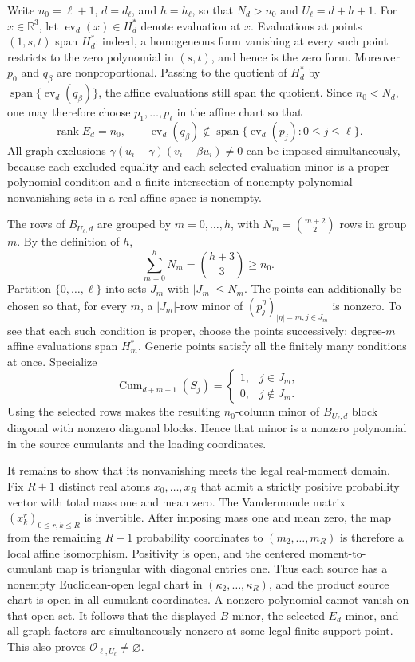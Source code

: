 Write \(n_0=\ell+1\), \(d=d_\ell\), and \(h=h_\ell\), so that \(N_d>n_0\) and \(U_\ell=d+h+1\).  For \(x\in\mathbb R^3\), let \(\operatorname{ev}_d(x)\in H_d^*\) denote evaluation at \(x\).  Evaluations at points \((1,s,t)\) span \(H_d^*\): indeed, a homogeneous form vanishing at every such point restricts to the zero polynomial in \((s,t)\), and hence is the zero form.  Moreover \(p_0\) and \(q_\beta\) are nonproportional.  Passing to the quotient of \(H_d^*\) by \(\operatorname{span}\{\operatorname{ev}_d(q_\beta)\}\), the affine evaluations still span the quotient.  Since \(n_0<N_d\), one may therefore choose \(p_1,\ldots,p_\ell\) in the affine chart so that
\[
 \operatorname{rank}E_d=n_0,
 \qquad
 \operatorname{ev}_d(q_\beta)\notin
 \operatorname{span}\{\operatorname{ev}_d(p_j):0\le j\le\ell\}.
\]
All graph exclusions \(\gamma(u_i-\gamma)(v_i-\beta u_i)\ne0\) can be imposed simultaneously, because each excluded equality and each selected evaluation minor is a proper polynomial condition and a finite intersection of nonempty polynomial nonvanishing sets in a real affine space is nonempty.

The rows of \(B_{U_\ell,d}\) are grouped by \(m=0,\ldots,h\), with \(N_m=\binom{m+2}{2}\) rows in group \(m\).  By the definition of \(h\),
\[
 \sum_{m=0}^{h}N_m=\binom{h+3}{3}\ge n_0.
\]
Partition \(\{0,\ldots,\ell\}\) into sets \(J_m\) with \(|J_m|\le N_m\).  The points can additionally be chosen so that, for every \(m\), a \(|J_m|\)-row minor of \((p_j^\eta)_{|\eta|=m,j\in J_m}\) is nonzero.  To see that each such condition is proper, choose the points successively; degree-\(m\) affine evaluations span \(H_m^*\).  Generic points satisfy all the finitely many conditions at once.  Specialize
\[
 \operatorname{Cum}_{d+m+1}(S_j)=
 \begin{cases}1,&j\in J_m,\\0,&j\notin J_m.
 \end{cases}
\]
Using the selected rows makes the resulting \(n_0\)-column minor of \(B_{U_\ell,d}\) block diagonal with nonzero diagonal blocks.  Hence that minor is a nonzero polynomial in the source cumulants and the loading coordinates.

It remains to show that its nonvanishing meets the legal real-moment domain.  Fix \(R+1\) distinct real atoms \(x_0,\ldots,x_R\) that admit a strictly positive probability vector with total mass one and mean zero.  The Vandermonde matrix \((x_k^r)_{0\le r,k\le R}\) is invertible.  After imposing mass one and mean zero, the map from the remaining \(R-1\) probability coordinates to \((m_2,\ldots,m_R)\) is therefore a local affine isomorphism.  Positivity is open, and the centered moment-to-cumulant map is triangular with diagonal entries one.  Thus each source has a nonempty Euclidean-open legal chart in \((\kappa_2,\ldots,\kappa_R)\), and the product source chart is open in all cumulant coordinates.  A nonzero polynomial cannot vanish on that open set.  It follows that the displayed \(B\)-minor, the selected \(E_d\)-minor, and all graph factors are simultaneously nonzero at some legal finite-support point.  This also proves \(\mathcal O_{\ell,U_\ell}\ne\varnothing\).


